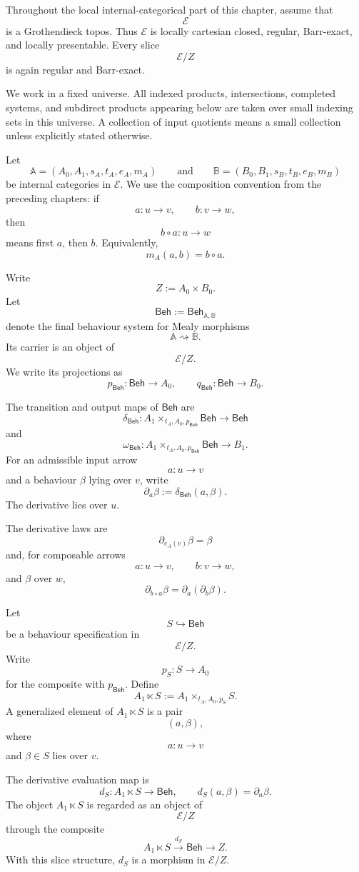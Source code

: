 Throughout the local internal-categorical part of this chapter, assume that
\[
\mathcal E
\]
is a Grothendieck topos. Thus \(\mathcal E\) is locally cartesian closed,
regular, Barr-exact, and locally presentable. Every slice
\[
\mathcal E/Z
\]
is again regular and Barr-exact.

We work in a fixed universe. All indexed products, intersections, completed
systems, and subdirect products appearing below are taken over small indexing
sets in this universe. A collection of input quotients means a small
collection unless explicitly stated otherwise.

Let
\[
\mathbb A
=
(A_0,A_1,s_A,t_A,e_A,m_A)
\qquad\text{and}\qquad
\mathbb B
=
(B_0,B_1,s_B,t_B,e_B,m_B)
\]
be internal categories in \(\mathcal E\). We use the composition convention
from the preceding chapters: if
\[
a:u\to v,
\qquad
b:v\to w,
\]
then
\[
b\circ a:u\to w
\]
means first \(a\), then \(b\). Equivalently,
\[
m_A(a,b)=b\circ a.
\]

Write
\[
Z:=A_0\times B_0.
\]
Let
\[
\mathsf{Beh}:=
\mathsf{Beh}_{\mathbb A,\mathbb B}
\]
denote the final behaviour system for Mealy morphisms
\[
\mathbb A\rightsquigarrow\mathbb B.
\]
Its carrier is an object of
\[
\mathcal E/Z.
\]
We write its projections as
\[
p_{\mathsf{Beh}}:\mathsf{Beh}\to A_0,
\qquad
q_{\mathsf{Beh}}:\mathsf{Beh}\to B_0.
\]

The transition and output maps of \(\mathsf{Beh}\) are
\[
\delta_{\mathsf{Beh}}:
A_1\times_{t_A,A_0,p_{\mathsf{Beh}}}\mathsf{Beh}
\to
\mathsf{Beh}
\]
and
\[
\omega_{\mathsf{Beh}}:
A_1\times_{t_A,A_0,p_{\mathsf{Beh}}}\mathsf{Beh}
\to
B_1.
\]
For an admissible input arrow
\[
a:u\to v
\]
and a behaviour \(\beta\) lying over \(v\), write
\[
\partial_a\beta
:=
\delta_{\mathsf{Beh}}(a,\beta).
\]
The derivative lies over \(u\).

The derivative laws are
\[
\partial_{e_A(v)}\beta=\beta
\]
and, for composable arrows
\[
a:u\to v,
\qquad
b:v\to w,
\]
and \(\beta\) over \(w\),
\[
\partial_{b\circ a}\beta
=
\partial_a(\partial_b\beta).
\]

Let
\[
S\hookrightarrow\mathsf{Beh}
\]
be a behaviour specification in
\[
\mathcal E/Z.
\]
Write
\[
p_S:S\to A_0
\]
for the composite with \(p_{\mathsf{Beh}}\). Define
\[
A_1\ltimes S
:=
A_1\times_{t_A,A_0,p_S}S.
\]
A generalized element of \(A_1\ltimes S\) is a pair
\[
(a,\beta),
\]
where
\[
a:u\to v
\]
and \(\beta\in S\) lies over \(v\).

The derivative evaluation map is
\[
d_S:A_1\ltimes S\to\mathsf{Beh},
\qquad
d_S(a,\beta)=\partial_a\beta.
\]
The object \(A_1\ltimes S\) is regarded as an object of
\[
\mathcal E/Z
\]
through the composite
\[
A_1\ltimes S
\xrightarrow{d_S}
\mathsf{Beh}
\to Z.
\]
With this slice structure, \(d_S\) is a morphism in \(\mathcal E/Z\).

